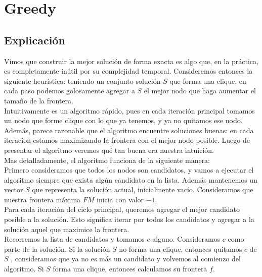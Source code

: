
\section{Greedy}

\subsection{Explicación}

Vimos que construir la mejor solución de forma exacta es algo que, en la práctica, es completamente inútil por su complejidad temporal. Consideremos entonces la siguiente heurística: teniendo un conjunto solución $S$ que forma una clique, en cada paso podemos golosamente agregar a $S$ el mejor nodo que haga aumentar el tamaño de la frontera. \\

Intuitivamente es un algoritmo rápido, pues en cada iteración principal tomamos un nodo que forme clique con lo que ya tenemos, y ya no quitamos ese nodo. Además, parece razonable que el algoritmo encuentre soluciones buenas: en cada iteracion estamos maximizando la frontera con el mejor nodo posible. Luego de presentar el algoritmo veremos qué tan buena era nuestra intuición. \\

Mas detalladamente, el algoritmo funciona de la siguiente manera: \\

Primero consideramos que todos los nodos son candidatos, y vamos a ejecutar el algoritmo siempre que exista algún candidato en la lista. Además mantenemos un vector $S$ que representa la solución actual, inicialmente vacío. Consideramos que nuestra frontera máxima $FM$ inicia con valor $-1$. \\

Para cada iteración del ciclo principal, queremos agregar el mejor candidato posible a la solución. Esto significa iterar por todos los candidatos y agregar a la solución aquel que maximice la frontera. \\

Recorremos la lista de candidatos y tomamos $c$ alguno. Consideramos $c$ como parte de la solución. Si la solución $S$ no forma una clique, entonces quitamos $c$ de $S$ , consideramos que ya no es más un candidato y volvemos al comienzo del algoritmo. Si $S$ forma una clique, entonces calculamos su frontera $f$. \\

